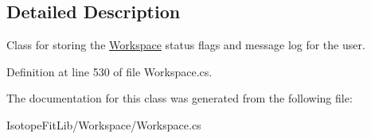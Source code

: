 \subsection{Detailed Description}
Class for storing the \hyperlink{class_isotope_fit_1_1_workspace}{Workspace} status flags and message log for the user. 



Definition at line 530 of file Workspace.\+cs.



The documentation for this class was generated from the following file\+:\begin{DoxyCompactItemize}
\item 
Isotope\+Fit\+Lib/\+Workspace/Workspace.\+cs\end{DoxyCompactItemize}

